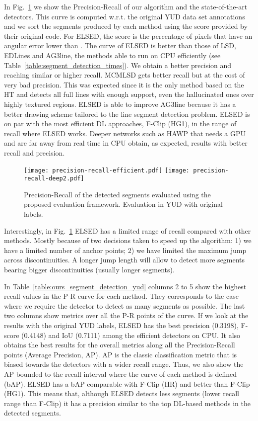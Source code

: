 \documentclass[preprint,12pt]{elsarticle}
\begin{document}
In Fig.~\ref{fig:ours-eval-precision-recall} we show the Precision-Recall of our algorithm and the state-of-the-art detectors. This curve is computed w.r.t. the original YUD data set annotations and we sort the segments produced by each method using the score provided by their original code. For ELSED, the score is the percentage of pixels that have an angular error lower than .
The curve of ELSED is better than those of LSD, EDLines and AG3line, the methods able to run on CPU efficiently (see Table~\ref{table:segment_detection_times}). We obtain a better precision and reaching similar or higher recall. MCMLSD gets better recall but at the cost of very bad precision. This was expected since it is the only method based on the HT and detects all full lines with enough support, even the hallucinated ones over highly textured regions. 
ELSED is able to improve AG3line because it has a better drawing scheme tailored to the line segment detection problem.
ELSED is on par with the most efficient DL approaches, F-Clip (HG1), in the range of recall where ELSED works. Deeper networks such as HAWP that needs a GPU and are far away from real time in CPU obtain, as expected, results with better recall and precision. \begin{figure}
    \centering
        \centering
        \texttt{[image: precision-recall-efficient.pdf]}
        \texttt{[image: precision-recall-deep2.pdf]}
        \caption{Precision-Recall of the detected segments evaluated using the proposed evaluation framework. Evaluation in YUD with original labels.}
        \label{fig:ours-eval-precision-recall}
\end{figure}

Interestingly, in Fig.~\ref{fig:ours-eval-precision-recall} ELSED has a limited range of recall compared with other methods. Mostly because of two decisions taken to speed up the algorithm: 1) we have a limited number of anchor points; 2) we have limited the maximum jump across discontinuities. A longer jump length will allow to detect more segments bearing bigger discontinuities (usually longer segments). 

In Table~\ref{table:ours_segment_detection_yud} columns 2 to 5 show the highest recall values in the P-R curve for each method.
They corresponds to the case where we require the detector to detect as many segments as possible. The last two columns show metrics over all the P-R points of the curve. 
If we look at the results with the original YUD labels, ELSED has the best precision (0.3198), F-score (0.4148) and IoU (0.7111) among the efficient detectors on CPU. It also obtains the best results for the overall metrics along all the Precision-Recall points (Average Precision, AP). AP is the classic classification metric that is biased towards the detectors with a wider recall range. Thus, we also show the AP bounded to the recall interval where the curve of each method is defined (bAP). ELSED has a bAP comparable with F-Clip (HR) and better than F-Clip (HG1). This means that, although ELSED detects less segments (lower recall range than F-Clip) it has a precision similar to the top DL-based methods in the detected segments.
\end{document}
